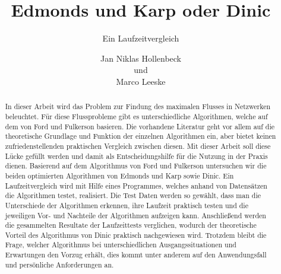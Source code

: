 \documentclass[a4paper]{llncs}
\begin{document}
\mainmatter  %

\title{Edmonds und Karp oder Dinic}
\subtitle{Ein Laufzeitvergleich}


%
%
\author{Jan Niklas Hollenbeck \\ und \\ Marco Leeske}
\maketitle


\begin{abstract}

In dieser Arbeit wird das Problem zur Findung des maximalen
Flusses in Netzwerken beleuchtet.
Für diese Flussprobleme gibt es unterschiedliche Algorithmen, welche auf dem von Ford und Fulkerson basieren.
 Die vorhandene Literatur geht vor allem auf die theoretische Grundlage und Funktion der einzelnen Algorithmen ein,  aber bietet keinen zufriedenstellenden praktischen Vergleich zwischen diesen.
 Mit dieser Arbeit soll diese Lücke gefüllt werden und damit als Entscheidungshilfe für die Nutzung in der Praxis dienen.
Basierend auf dem Algorithmus von Ford und Fulkerson untersuchen wir die beiden optimierten Algorithmen von Edmonds und Karp sowie Dinic.
Ein Laufzeitvergleich wird mit Hilfe eines Programmes, welches anhand von Datensätzen die Algorithmen testet, realisiert.
Die Test Daten werden so gewählt, dass man die Unterschiede der Algorithmen erkennen, ihre Laufzeit praktisch testen und die jeweiligen Vor- und Nachteile der Algorithmen aufzeigen kann.
Anschließend werden die gesammelten Resultate der Laufzeittests verglichen,
wodurch der theoretische Vorteil des Algorithmus von Dinic praktisch nachgewiesen wird.
 Trotzdem bleibt die Frage, welcher Algorithmus bei unterschiedlichen Ausgangssituationen und Erwartungen den Vorzug erhält, dies kommt unter anderem auf den Anwendungsfall und persönliche Anforderungen an.

\end{abstract}
\end{document}
